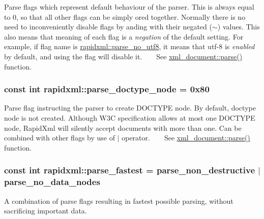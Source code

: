 Parse flags which represent default behaviour of the parser. This is always equal to 0, so that all other flags can be simply ored together. Normally there is no need to inconveniently disable flags by anding with their negated ($\sim$) values. This also means that meaning of each flag is a {\itshape negation} of the default setting. For example, if flag name is \hyperlink{namespacerapidxml_a22d4aefaceb00d7afabfef7107b108da}{rapidxml\+::parse\+\_\+no\+\_\+utf8}, it means that utf-\/8 is {\itshape enabled} by default, and using the flag will disable it. ~\newline
~\newline
 See \hyperlink{singletonrapidxml_1_1xml__document_ac6e73ff9ac323bf5a370c38feb03a6b1}{xml\+\_\+document\+::parse()} function. \hypertarget{namespacerapidxml_a41002b49780a90a0bbcc28ce8b895fe4}{
\subsubsection[{parse\+\_\+doctype\+\_\+node}]{\setlength{\rightskip}{0pt plus 5cm}const int rapidxml\+::parse\+\_\+doctype\+\_\+node = 0x80}}\label{namespacerapidxml_a41002b49780a90a0bbcc28ce8b895fe4}
Parse flag instructing the parser to create D\+O\+C\+T\+Y\+P\+E node. By default, doctype node is not created. Although W3\+C specification allows at most one D\+O\+C\+T\+Y\+P\+E node, Rapid\+Xml will silently accept documents with more than one. Can be combined with other flags by use of $\vert$ operator. ~\newline
~\newline
 See \hyperlink{singletonrapidxml_1_1xml__document_ac6e73ff9ac323bf5a370c38feb03a6b1}{xml\+\_\+document\+::parse()} function. \hypertarget{namespacerapidxml_a64da06dfdab7c86ca954bda4fecb978f}{
\subsubsection[{parse\+\_\+fastest}]{\setlength{\rightskip}{0pt plus 5cm}const int rapidxml\+::parse\+\_\+fastest = {\bf parse\+\_\+non\+\_\+destructive} $\vert$ {\bf parse\+\_\+no\+\_\+data\+\_\+nodes}}}\label{namespacerapidxml_a64da06dfdab7c86ca954bda4fecb978f}
A combination of parse flags resulting in fastest possible parsing, without sacrificing important data. ~\newline
